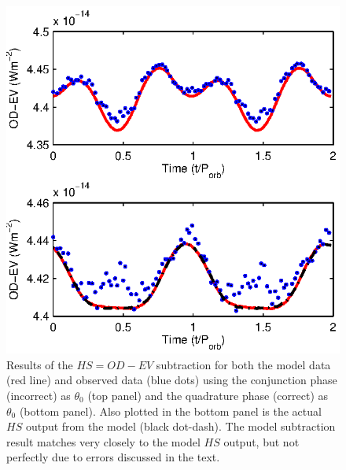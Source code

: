 \documentclass[preprint2]{aastex}
\newcommand{\note}[1]{[$\blacktriangleright$~\textbf{#1}~$\blacktriangleleft$]}
\begin{document}
\begin{figure}[h!]
\centering
\includegraphics[width=\columnwidth]{./figs/AMCVnSubBoth.eps}
\caption{Results of the $HS = OD - EV$ subtraction for both the model data (red line) and observed data (blue dots) using the conjunction phase (incorrect) as $\theta_0$ (top panel) and the quadrature phase (correct) as $\theta_0$ (bottom panel). Also plotted in the bottom panel is the actual $HS$ output from the model (black dot-dash). The model subtraction result matches very closely to the model $HS$ output, but not perfectly due to errors discussed in the text.}
\label{fig.subt2}
\end{figure}






\end{document}
